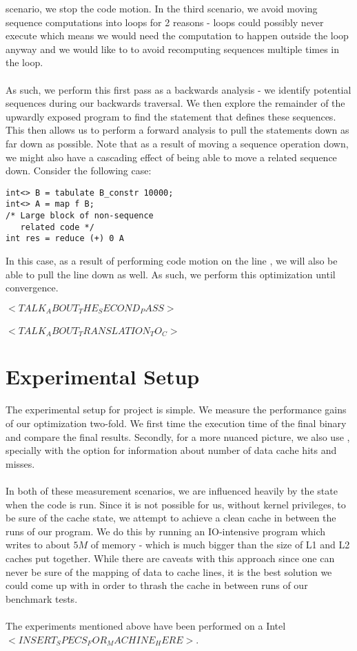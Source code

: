 \documentclass[a4paper,twocolumn]{article}
\begin{document}
scenario, we stop the code motion. In the third scenario, we avoid moving
sequence computations into loops for 2 reasons - loops could possibly never
execute which means we would need the computation to happen outside the loop
anyway and we would like to to avoid recomputing sequences
multiple times in the loop.
\\
\\As such, we perform this first pass as a backwards analysis - we identify
potential sequences during our backwards traversal. We then explore the
remainder of the upwardly exposed program to find the statement that defines
these sequences. This then allows us to perform a forward analysis to pull the
statements down as far down as possible. Note that as a result of moving a
sequence operation down, we might also have a cascading effect of being able to
move a related sequence down. Consider the following case:
\begin{verbatim}
int<> B = tabulate B_constr 10000;
int<> A = map f B;
/* Large block of non-sequence
   related code */
int res = reduce (+) 0 A
\end{verbatim}
In this case, as a result of performing code motion on the line , we will also be able to pull the line 
down as well. As such, we perform this optimization until convergence.

$<TALK_ABOUT_THE_SECOND_PASS>$
\\
\\
$<TALK_ABOUT_TRANSLATION_TO_C>$

\section{Experimental Setup}
The experimental setup for project is simple. We measure the performance gains
of our optimization two-fold. We first time the execution time of the final
binary and compare the final results. Secondly, for a more nuanced picture, we
also use , specially with the  option for
information about number of data cache hits and misses.
\\
\\In both of these measurement scenarios, we are influenced heavily by the
state when the code is run. Since it is not possible for us, without kernel
privileges, to be sure of the cache state, we attempt to achieve a clean cache
in between the runs of our program. We do this by running an IO-intensive
program which writes to about $5M$ of memory - which is much bigger than the
size of L1 and L2 caches put together. While there are caveats with this approach
since one can never be sure of the mapping of data to cache lines, it is the
best solution we could come up with in order to thrash the cache in between
runs of our benchmark tests.
\\
\\ The experiments mentioned above have been performed on a Intel
$<INSERT_SPECS_FOR_MACHINE_HERE>$.
\end{document}
